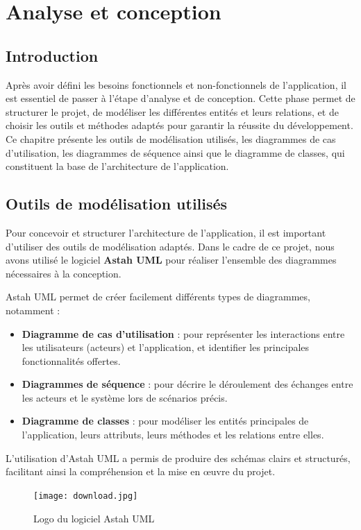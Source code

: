 \documentclass[12pt,a4paper]{report}
\begin{document}
\chapter{Analyse et conception}
\section*{Introduction}

Après avoir défini les besoins fonctionnels et non-fonctionnels de l’application, il est essentiel de passer à l’étape d’analyse et de conception. Cette phase permet de structurer le projet, de modéliser les différentes entités et leurs relations, et de choisir les outils et méthodes adaptés pour garantir la réussite du développement. Ce chapitre présente les outils de modélisation utilisés, les diagrammes de cas d’utilisation, les diagrammes de séquence ainsi que le diagramme de classes, qui constituent la base de l’architecture de l’application.

\section{Outils de modélisation utilisés}

Pour concevoir et structurer l’architecture de l’application, il est important d’utiliser des outils de modélisation adaptés. Dans le cadre de ce projet, nous avons utilisé le logiciel \textbf{Astah UML} pour réaliser l’ensemble des diagrammes nécessaires à la conception.

Astah UML permet de créer facilement différents types de diagrammes, notamment :
\begin{itemize}
    \item \textbf{Diagramme de cas d’utilisation} : pour représenter les interactions entre les utilisateurs (acteurs) et l’application, et identifier les principales fonctionnalités offertes.
    \item \textbf{Diagrammes de séquence} : pour décrire le déroulement des échanges entre les acteurs et le système lors de scénarios précis.
    \item \textbf{Diagramme de classes} : pour modéliser les entités principales de l’application, leurs attributs, leurs méthodes et les relations entre elles.
\end{itemize}

L’utilisation d’Astah UML a permis de produire des schémas clairs et structurés, facilitant ainsi la compréhension et la mise en œuvre du projet.
\begin{figure}[H]
    \centering
    \texttt{[image: download.jpg]}
    \caption{Logo du logiciel Astah UML}
    \label{fig:astah_uml}
\end{figure}
\end{document}
